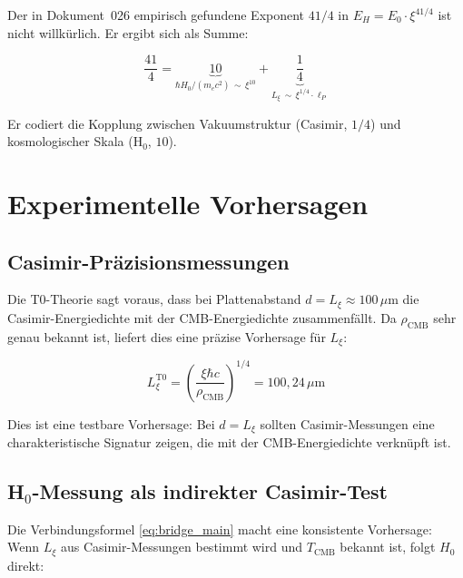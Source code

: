 \begin{keyresult}
    Der in Dokument~026 empirisch gefundene Exponent $41/4$ in
    $E_H = E_0 \cdot \xi^{41/4}$ ist nicht willkürlich. Er ergibt sich
    als Summe:

    \begin{equation}
        \frac{41}{4}
        = \underbrace{10}_{\hbar H_0/(m_e c^2) \,\sim\, \xi^{10}}
        + \underbrace{\frac{1}{4}}_{L_\xi \,\sim\, \xi^{1/4} \cdot \ell_P}
        \label{eq:41_4_explained}
    \end{equation}

    Er codiert die Kopplung zwischen Vakuumstruktur (Casimir, $1/4$)
    und kosmologischer Skala (H$_0$, $10$).
\end{keyresult}

\section{Experimentelle Vorhersagen}
\label{sec:vorhersagen}

\subsection{Casimir-Präzisionsmessungen}

Die T0-Theorie sagt voraus, dass bei Plattenabstand $d = L_\xi \approx 100\,\mu\text{m}$
die Casimir-Energiedichte mit der CMB-Energiedichte zusammenfällt. Da $\rho_\text{CMB}$
sehr genau bekannt ist, liefert dies eine präzise Vorhersage für $L_\xi$:

\begin{equation}
    L_\xi^\text{T0}
    = \left(\frac{\xi\hbar c}{\rho_\text{CMB}}\right)^{1/4}
    = 100{,}24\,\mu\text{m}
    \label{eq:Lxi_prediction}
\end{equation}

Dies ist eine testbare Vorhersage: Bei $d = L_\xi$ sollten Casimir-Messungen
eine charakteristische Signatur zeigen, die mit der CMB-Energiedichte
verknüpft ist.

\subsection{H\texorpdfstring{$_0$}{0}-Messung als indirekter Casimir-Test}

Die Verbindungsformel \eqref{eq:bridge_main} macht eine konsistente Vorhersage:
Wenn $L_\xi$ aus Casimir-Messungen bestimmt wird und $T_\text{CMB}$ bekannt ist,
folgt $H_0$ direkt:

